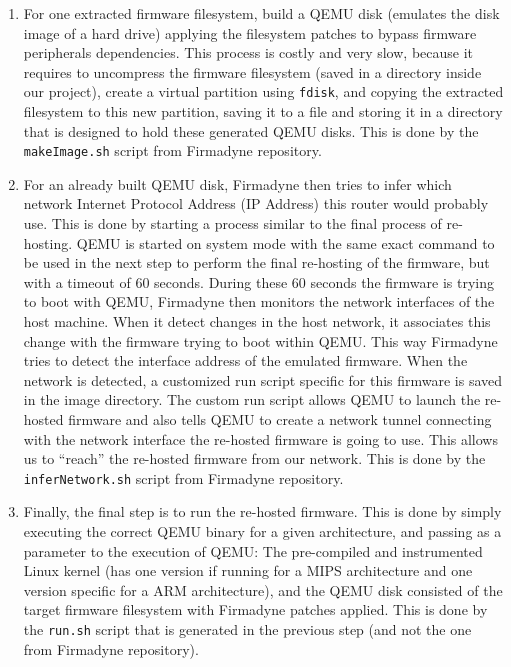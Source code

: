 \begin{enumerate}
    \item For one extracted firmware filesystem, build a QEMU disk (emulates the disk image of a hard drive) applying the filesystem patches to bypass firmware peripherals dependencies. This process is costly and very slow, because it requires to uncompress the firmware filesystem (saved in a directory inside our project), create a virtual partition using {\tt fdisk}, and copying the extracted filesystem to this new partition, saving it to a file and storing it in a directory that is designed to hold these generated QEMU disks. This is done by the {\tt makeImage.sh} script from Firmadyne repository.
    
    \item For an already built QEMU disk, Firmadyne then tries to infer which network Internet Protocol Address (IP Address) this router would probably use. This is done by starting a process similar to the final process of re-hosting. QEMU is started on system mode with the same exact command to be used in the next step to perform the final re-hosting of the firmware, but with a timeout of 60 seconds. During these 60 seconds the firmware is trying to boot with QEMU, Firmadyne then monitors the network interfaces of the host machine. When it detect changes in the host network, it associates this change with the firmware trying to boot within QEMU. This way Firmadyne tries to detect the interface address of the emulated firmware. When the network is detected, a customized run script specific for this firmware is saved in the image directory. The custom run script allows QEMU to launch the re-hosted firmware and also tells QEMU to create a network tunnel connecting with the network interface the re-hosted firmware is going to use. This allows us to ``reach'' the re-hosted firmware from our network. This is done by the {\tt inferNetwork.sh} script from Firmadyne repository.
    
    \item Finally, the final step is to run the re-hosted firmware. This is done by simply executing the correct QEMU binary for a given architecture, and passing as a parameter to the execution of QEMU: The pre-compiled and instrumented Linux kernel (has one version if running for a MIPS architecture and one version specific for a ARM architecture), and the QEMU disk consisted of the target firmware filesystem with Firmadyne patches applied. This is done by the {\tt run.sh} script that is generated in the previous step (and not the one from Firmadyne repository).
\end{enumerate}

